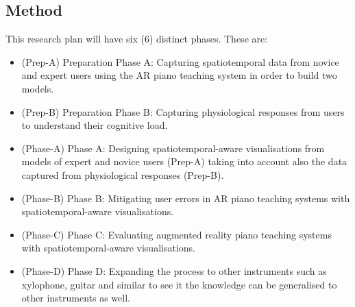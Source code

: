 \documentclass[manuscript,screen]{acmart}
\begin{document}
\subsection{Method}
This research plan will have six (6) distinct phases. These are:
\begin{itemize}
    \item (Prep-A) Preparation Phase A: Capturing spatiotemporal data from novice and expert users using the AR piano teaching system in order to build two models. 
    \item (Prep-B) Preparation Phase B: Capturing physiological responses from users to understand their cognitive load. 
    \item (Phase-A) Phase A: Designing spatiotemporal-aware visualisations from models of expert and novice users (Prep-A) taking into account also the data captured from physiological responses (Prep-B).
    \item (Phase-B) Phase B: Mitigating user errors in AR piano teaching systems with spatiotemporal-aware visualisations.
    \item (Phase-C) Phase C: Evaluating augmented reality piano teaching systems with spatiotemporal-aware visualisations.
    \item (Phase-D) Phase D: Expanding the process to other instruments such as xylophone, guitar and similar to see it the knowledge can be generalised to other instruments as well. 
\end{itemize}
\end{document}
